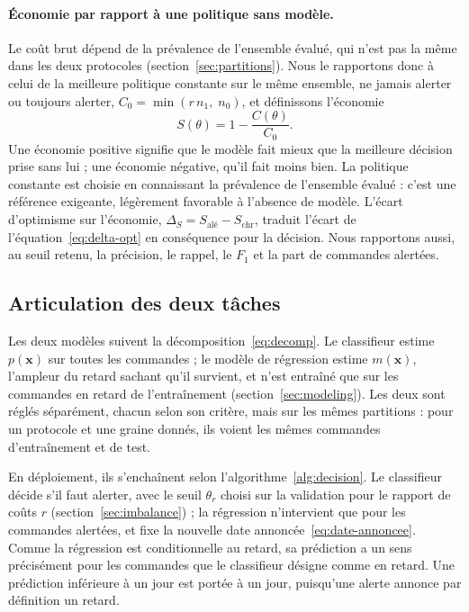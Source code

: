 \documentclass[11pt,a4paper]{article}
\theoremstyle{definition}
\begin{document}
\paragraph{Économie par rapport à une politique sans modèle.} Le coût brut dépend de la prévalence de l'ensemble évalué, qui n'est pas la même dans les deux protocoles (section~\ref{sec:partitions}). Nous le rapportons donc à celui de la meilleure politique constante sur le même ensemble, ne jamais alerter ou toujours alerter, $C_0 = \min(r\, n_1,\; n_0)$, et définissons l'économie
\begin{equation}
  S(\theta) = 1 - \frac{C(\theta)}{C_0}.
  \label{eq:economie}
\end{equation}
Une économie positive signifie que le modèle fait mieux que la meilleure décision prise sans lui ; une économie négative, qu'il fait moins bien. La politique constante est choisie en connaissant la prévalence de l'ensemble évalué : c'est une référence exigeante, légèrement favorable à l'absence de modèle. L'écart d'optimisme sur l'économie, $\Delta_S = S_{\text{alé}} - S_{\mathrm{chr}}$, traduit l'écart de l'équation~\eqref{eq:delta-opt} en conséquence pour la décision. Nous rapportons aussi, au seuil retenu, la précision, le rappel, le $F_1$ et la part de commandes alertées.

\subsection{Articulation des deux tâches}
\label{sec:articulation}

Les deux modèles suivent la décomposition~\eqref{eq:decomp}. Le classifieur estime $p(\mathbf{x})$ sur toutes les commandes ; le modèle de régression estime $m(\mathbf{x})$, l'ampleur du retard sachant qu'il survient, et n'est entraîné que sur les commandes en retard de l'entraînement (section~\ref{sec:modeling}). Les deux sont réglés séparément, chacun selon son critère, mais sur les mêmes partitions : pour un protocole et une graine donnés, ils voient les mêmes commandes d'entraînement et de test.

En déploiement, ils s'enchaînent selon l'algorithme~\ref{alg:decision}. Le classifieur décide s'il faut alerter, avec le seuil $\theta_r$ choisi sur la validation pour le rapport de coûts $r$ (section~\ref{sec:imbalance}) ; la régression n'intervient que pour les commandes alertées, et fixe la nouvelle date annoncée~\eqref{eq:date-annoncee}. Comme la régression est conditionnelle au retard, sa prédiction a un sens précisément pour les commandes que le classifieur désigne comme en retard. Une prédiction inférieure à un jour est portée à un jour, puisqu'une alerte annonce par définition un retard.
\end{document}
